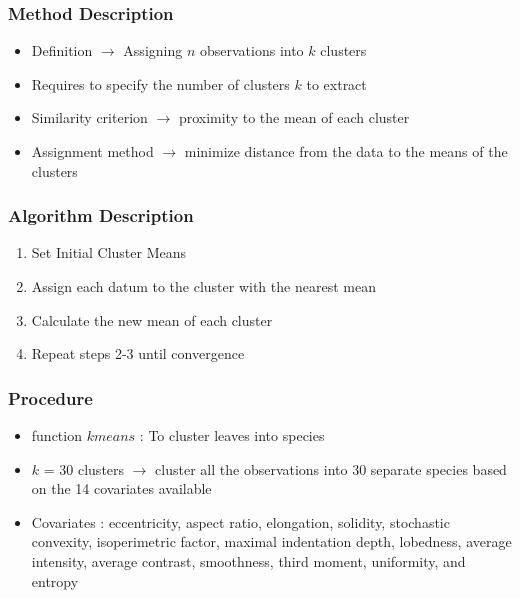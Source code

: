 \documentclass{beamer}
\begin{document}
\begin{frame}
\frametitle{Method Description} 
\begin{itemize}
\item Definition $\rightarrow$ Assigning $n$ observations into $k$ clusters
\item Requires to specify the number of clusters $k$ to extract
\item Similarity criterion $\rightarrow$ proximity  to	the	mean of each cluster
\item Assignment method $\rightarrow$ minimize	distance	from the data to the means of the clusters
\end{itemize}
\end{frame}





\begin{frame}
\frametitle{Algorithm Description}
\begin{center}
\begin{enumerate}
\item Set Initial Cluster Means
\item Assign each datum to	the	cluster	with	
the	nearest	mean
\item Calculate	the	new	mean of each cluster
\item Repeat steps 2-3 until convergence	

\end{enumerate}
\end{center}
\end{frame}






\begin{frame}
\frametitle{Procedure}
\begin{itemize}
\item function $kmeans$ : To cluster leaves into species
\item $k$ = 30 clusters $\rightarrow$ cluster all the observations into 30 separate species based on the 14 covariates available
\item Covariates : eccentricity, aspect ratio, elongation, solidity, stochastic convexity, isoperimetric factor, maximal indentation depth, lobedness, average intensity, average contrast, smoothness, third moment, uniformity, and entropy

\end{itemize}
\end{frame}
\end{document}
